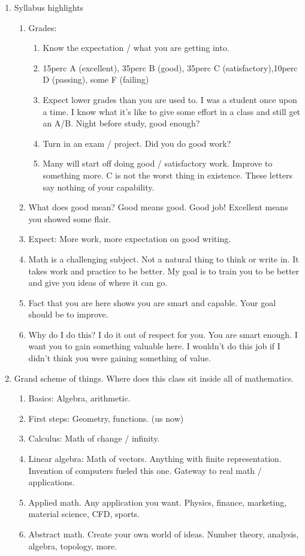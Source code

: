 \documentclass{article}
\begin{document}
\begin{enumerate}
\item Syllabus highlights
\begin{enumerate}
\item Grades: 
\begin{enumerate}
\item Know the expectation / what you are getting into.
\item 15perc A (excellent), 35perc B (good), 35perc C (satisfactory),10perc D (passing), some F (failing)
\item Expect lower grades than you are used to. I was a student once upon a time. I know what it's like to give some effort in a class and still get an A/B. Night before study, good enough? 
\item Turn in an exam / project. Did you do good work?
\item Many will start off doing good / satisfactory work. Improve to something more. C is not the worst thing in existence. These letters say nothing of your capability. 
\end{enumerate}
\item What does good mean? Good means good. Good job! Excellent means you showed some flair.
\item Expect: More work, more expectation on good writing.
\item Math is a challenging subject. Not a natural thing to think or write in. It takes work and practice to be better. My goal is to train you to be better and give you ideas of where it can go.
\item Fact that you are here shows you are smart and capable. Your goal should be to improve. 
\item Why do I do this? I do it out of respect for you. You are smart enough. I want you to gain something valuable here. I wouldn't do this job if I didn't think you were gaining something of value.
\end{enumerate}

\item Grand scheme of things. Where does this class sit inside all of mathematics.
\begin{enumerate}
\item Basics: Algebra, arithmetic.
\item First steps: Geometry, functions. (us now)
\item Calculus: Math of change / infinity.
\item Linear algebra: Math of vectors. Anything with finite representation. Invention of computers fueled this one. Gateway to real math / applications.
\item Applied math. Any application you want. Physics, finance, marketing, material science, CFD, sports. 
\item Abstract math. Create your own world of ideas. Number theory, analysis, algebra, topology, more. 
\end{enumerate}
\end{enumerate}
\end{document}
